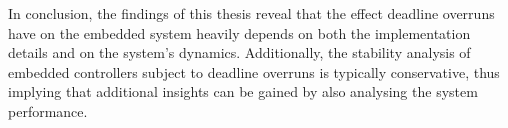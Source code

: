 In conclusion, the findings of this thesis reveal that the effect deadline overruns have on the embedded system heavily depends on both the implementation details and on the system's dynamics.
Additionally, the stability analysis of embedded controllers subject to deadline overruns is typically conservative, thus implying that additional insights can be gained by also analysing the system performance.



%
%
%
